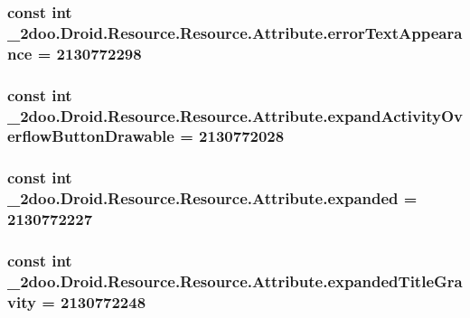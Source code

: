 \hypertarget{class__2doo_1_1_droid_1_1_resource_1_1_attribute_7e9b40f542ce13f50ea230ecf1bf0845}{
\subsubsection[{errorTextAppearance}]{\setlength{\rightskip}{0pt plus 5cm}const int \_\-2doo.Droid.Resource.Resource.Attribute.errorTextAppearance = 2130772298}}
\label{class__2doo_1_1_droid_1_1_resource_1_1_attribute_7e9b40f542ce13f50ea230ecf1bf0845}


\hypertarget{class__2doo_1_1_droid_1_1_resource_1_1_attribute_8fa8cf9a73f72726da2b3c2950be6f1e}{
\subsubsection[{expandActivityOverflowButtonDrawable}]{\setlength{\rightskip}{0pt plus 5cm}const int \_\-2doo.Droid.Resource.Resource.Attribute.expandActivityOverflowButtonDrawable = 2130772028}}
\label{class__2doo_1_1_droid_1_1_resource_1_1_attribute_8fa8cf9a73f72726da2b3c2950be6f1e}


\hypertarget{class__2doo_1_1_droid_1_1_resource_1_1_attribute_3d6a70053946d87ea3f8112cbfc72e4d}{
\subsubsection[{expanded}]{\setlength{\rightskip}{0pt plus 5cm}const int \_\-2doo.Droid.Resource.Resource.Attribute.expanded = 2130772227}}
\label{class__2doo_1_1_droid_1_1_resource_1_1_attribute_3d6a70053946d87ea3f8112cbfc72e4d}


\hypertarget{class__2doo_1_1_droid_1_1_resource_1_1_attribute_f1bceb0be4a99c934962358777e46359}{
\subsubsection[{expandedTitleGravity}]{\setlength{\rightskip}{0pt plus 5cm}const int \_\-2doo.Droid.Resource.Resource.Attribute.expandedTitleGravity = 2130772248}}
\label{class__2doo_1_1_droid_1_1_resource_1_1_attribute_f1bceb0be4a99c934962358777e46359}


